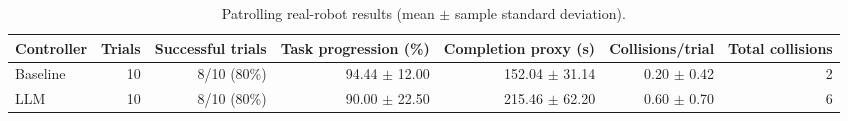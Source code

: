 \begin{table}[htbp]
\centering
\caption{Patrolling real-robot results (mean $\pm$ sample standard deviation).}
\label{tab:real-patrolling}
\begin{tabular}{lrrrrrr}
\hline
Controller & Trials & Successful trials & Task progression (\%) & Completion proxy (s) & Collisions/trial & Total collisions \\
\hline
Baseline & 10 & 8/10 (80\%) & 94.44 $\pm$ 12.00 & 152.04 $\pm$ 31.14 & 0.20 $\pm$ 0.42 & 2 \\
LLM & 10 & 8/10 (80\%) & 90.00 $\pm$ 22.50 & 215.46 $\pm$ 62.20 & 0.60 $\pm$ 0.70 & 6 \\
\hline
\end{tabular}
\end{table}
